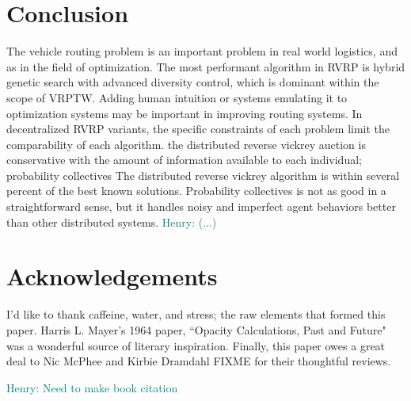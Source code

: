 \documentclass{sig-alternate}
\newcommand{\allcomments}[1]{{#1}}
\newcommand{\hfcomment}[1]{\textcolor{Teal}{\allcomments{Henry: {#1}}}}
\begin{document}
\section{Conclusion}
\label{conclusion}
The vehicle routing problem is an important problem in real world logistics, and as in the field of optimization. The most performant algorithm in RVRP is hybrid genetic search with advanced diversity control, which is dominant within the scope of VRPTW. Adding human intuition or systems emulating it to optimization systems may be important in improving routing systems. In decentralized RVRP variants, the specific constraints of each problem limit the comparability of each algorithm. the distributed reverse vickrey auction is conservative with the amount of information available to each individual; probability collectives The distributed reverse vickrey algorithm is within several percent of the best known solutions. Probability collectives is not as good in a straightforward sense, but it handles noisy and imperfect agent behaviors better than other distributed systems. 
 \hfcomment{(...)}
\section{Acknowledgements}
I'd like to thank caffeine, water, and stress; the raw elements that formed this paper. Harris L. Mayer's 1964 paper, ``Opacity Calculations, Past and Future" was a wonderful source of literary inspiration. Finally, this paper owes a great deal to Nic McPhee and Kirbie Dramdahl FIXME for their thoughtful reviews.

  


\hfcomment{Need to make book citation}
\end{document}
